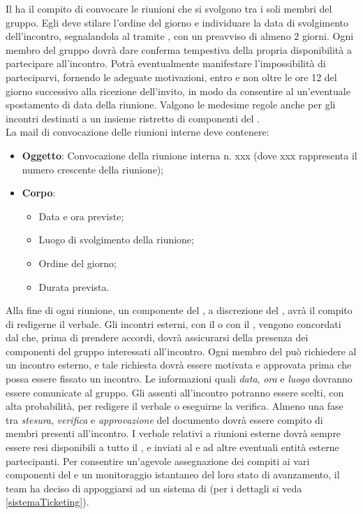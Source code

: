 Il \rRP ha il compito di convocare le riunioni che si svolgono tra i soli membri del gruppo. Egli deve stilare l'ordine del giorno e individuare la data di svolgimento dell'incontro, segnalandola al  tramite , con un preavviso di almeno 2 giorni.
Ogni membro del gruppo dovrà dare conferma tempestiva della propria disponibilità a partecipare all'incontro. Potrà eventualmente manifestare l'impossibilità di parteciparvi, fornendo le adeguate motivazioni, entro e non oltre le ore 12 del giorno successivo alla ricezione dell'invito, in modo da consentire al \rRP un'eventuale spostamento di data della riunione.
Valgono le medesime regole anche per gli incontri destinati a un insieme ristretto di componenti del .
\\La mail di convocazione delle riunioni interne deve contenere:
\begin{itemize}
\item \textbf{Oggetto}: Convocazione della riunione interna n. xxx (dove xxx rappresenta il numero crescente della riunione);
\item \textbf{Corpo}:
\begin{itemize}
\item Data e ora previste;
\item Luogo di svolgimento della riunione;
\item Ordine del giorno;
\item Durata prevista.
\end{itemize}
\end{itemize}
Alla fine di ogni riunione, un componente del , a discrezione del \rRP, avrà il compito di redigerne il verbale.
Gli incontri esterni, con il  o con il , vengono concordati dal \rRP che, prima di prendere accordi, dovrà assicurarsi della presenza dei componenti del gruppo interessati all'incontro.
Ogni membro del  può richiedere al \rRP un incontro esterno, e tale richiesta dovrà essere motivata e approvata prima che possa essere fissato un incontro.
Le informazioni quali \emph{data}, \emph{ora} e \emph{luogo} dovranno essere comunicate al gruppo.
Gli assenti all'incontro potranno essere scelti, con alta probabilità, per redigere il verbale o eseguirne la verifica. Almeno una fase tra \emph{stesura}, \emph{verifica} e \emph{approvazione} del documento dovrà essere compito di membri presenti all'incontro. I verbale relativi a riunioni esterne dovrà sempre essere resi disponibili a tutto il , e inviati al  e ad altre eventuali entità esterne partecipanti.
Per consentire un'agevole assegnazione dei compiti ai vari componenti del  e un monitoraggio istantaneo del loro stato di avanzamento, il team ha deciso di appoggiarsi ad un sistema di  (per i dettagli si veda \ref{sistemaTicketing}).

